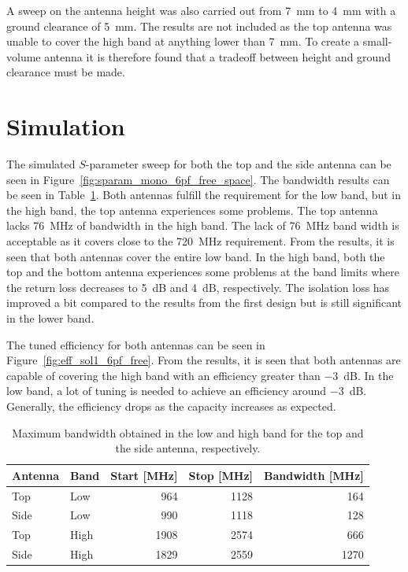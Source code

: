 A sweep on the antenna height was also carried out from \SI{7}{mm} to \SI{4}{mm} with a ground clearance of \SI{5}{mm}. The results are not included as the top antenna was unable to cover the high band at anything lower than \SI{7}{mm}. To create a small-volume antenna it is therefore found that a tradeoff between height and ground clearance must be made.

\FloatBarrier
\section{Simulation}

The simulated $S$-parameter sweep for both the top and the side antenna can be seen in Figure~\ref{fig:sparam_mono_6pf_free_space}. The bandwidth results can be seen in Table~\ref{tab:bw_sol1_6pf}. Both antennas fulfill the requirement for the low band, but in the high band, the top antenna experiences some problems. The top antenna lacks \SI{76}{MHz} of bandwidth in the high band. The lack of \SI{76}{MHz} band width is acceptable as it covers close to the \SI{720}{MHz} requirement.
From the results, it is seen that both antennas cover the entire low band. In the high band, both the top and the bottom antenna experiences some problems at the band limits where the return loss decreases to \SI{5}{dB} and \SI{4}{dB}, respectively. The isolation loss has improved a bit compared to the results from the first design but is still significant in the lower band.     

The tuned efficiency for both antennas can be seen in Figure~\ref{fig:eff_sol1_6pf_free}. From the results, it is seen that both antennas are capable of covering the high band with an efficiency greater than \SI{-3}{dB}. In the low band, a lot of tuning is needed to achieve an efficiency around \SI{-3}{dB}. Generally, the efficiency drops as the capacity increases as expected.

\begin{table}
  \centering
  \begin{tabular}{|l|l|r|r|r|}
    \hline
    Antenna & Band & Start [MHz] & Stop [MHz] & Bandwidth [MHz] \\
    \hline
    Top     & Low  & 964         & 1128      & 164 \\
    Side    & Low  & 990         & 1118      & 128 \\
    \hline
    Top     & High & 1908        & 2574       & 666 \\
    Side    & High & 1829        & 2559      & 1270 \\
    \hline
  \end{tabular}
  \caption{Maximum bandwidth obtained in the low and high band for the top and the side antenna, respectively.}
  \label{tab:bw_sol1_6pf}
\end{table}

